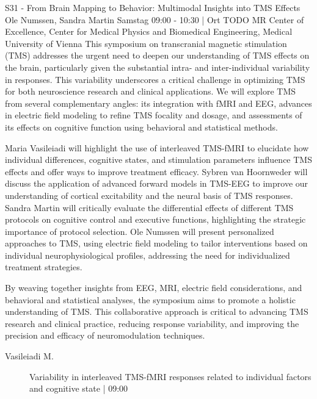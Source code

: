 
            \begin{symposium}
            {S31 - From Brain Mapping to Behavior: Multimodal Insights into TMS Effects}
            { Ole Numssen, Sandra Martin}
            {Samstag 09:00 - 10:30 | Ort TODO}
            {MR Center of Excellence, Center for Medical Physics and Biomedical Engineering, Medical University of Vienna}
            This symposium on transcranial magnetic stimulation (TMS) addresses the urgent need to deepen our understanding of TMS effects on the brain, particularly given the substantial intra- and inter-individual variability in responses. This variability underscores a critical challenge in optimizing TMS for both neuroscience research and clinical applications. We will explore TMS from several complementary angles: its integration with fMRI and EEG, advances in electric field modeling to refine TMS focality and dosage, and assessments of its effects on cognitive function using behavioral and statistical methods.

Maria Vasileiadi will highlight the use of interleaved TMS-fMRI to elucidate how individual differences, cognitive states, and stimulation parameters influence TMS effects and offer ways to improve treatment efficacy. Sybren van Hoornweder will discuss the application of advanced forward models in TMS-EEG to improve our understanding of cortical excitability and the neural basis of TMS responses. Sandra Martin will critically evaluate the differential effects of different TMS protocols on cognitive control and executive functions, highlighting the strategic importance of protocol selection. Ole Numssen will present personalized approaches to TMS, using electric field modeling to tailor interventions based on individual neurophysiological profiles, addressing the need for individualized treatment strategies.

By weaving together insights from EEG, MRI, electric field considerations, and behavioral and statistical analyses, the symposium aims to promote a holistic understanding of TMS. This collaborative approach is critical to advancing TMS research and clinical practice, reducing response variability, and improving the precision and efficacy of neuromodulation techniques.
            \begin{description}    
            
                \item [ Vasileiadi M.] Variability in interleaved TMS­-fMRI responses related to individual factors and cognitive state \textcolor{mygray}{ | 09:00}    
                

\end{description}
\end{symposium}
